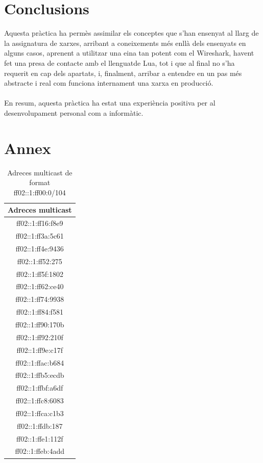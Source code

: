 \documentclass{article}
\begin{document}
\section{Conclusions}
Aquesta pràctica ha permès assimilar els conceptes que s'han ensenyat
al llarg de la assignatura de xarxes, arribant a coneixements més enllà
dels ensenyats en alguns casos, aprenent a utilitzar una eina tan potent
com el Wireshark, havent fet una presa de contacte amb el llenguatde Lua,
tot i que al final no s'ha requerit en cap dels apartats, i, finalment, arribar
a entendre en un pas més abstracte i real com funciona internament una xarxa
en producció.\\
\\
En resum, aquesta pràctica ha estat una experiència positiva per al desenvolupament
personal com a informàtic.
\newpage
\section{Annex}
\begin{table}[!h]
\centering
\begin{tabular}{c}
Adreces multicast\\
\hline
ff02::1:ff16:f8e9\\
ff02::1:ff3a:5c61\\
ff02::1:ff4e:9436\\
ff02::1:ff52:275\\
ff02::1:ff5f:1802\\
ff02::1:ff62:ce40\\
ff02::1:ff74:9938\\
ff02::1:ff84:f581\\
ff02::1:ff90:170b\\
ff02::1:ff92:210f\\
ff02::1:ff9e:c17f\\
ff02::1:ffac:b684\\
ff02::1:ffb5:ecdb\\
ff02::1:ffbf:a6df\\
ff02::1:ffc8:6083\\
ff02::1:ffca:c1b3\\
ff02::1:ffdb:187\\
ff02::1:ffe1:112f\\
ff02::1:ffeb:4add\\
\end{tabular}
\caption{Adreces multicast de format ff02::1:ff00:0/104}
\label{mult:104}
\end{table}
\end{document}
